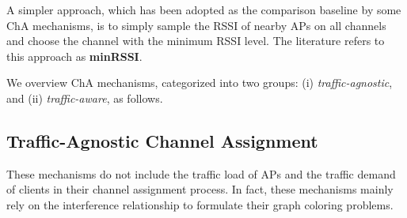 A simpler approach, which has been adopted as the comparison baseline by some ChA mechanisms, is to simply sample the RSSI of nearby APs on all channels and choose the channel with the minimum RSSI level.
The literature refers to this approach as \textbf{minRSSI}.



We overview ChA mechanisms, categorized into two groups: (i) \textit{traffic-agnostic}, and (ii) \textit{traffic-aware}, as follows.



\subsection{{Traffic-Agnostic Channel Assignment}} 
\label{ChA_traffic_ag}
These mechanisms do not include the traffic load of APs and the traffic demand of clients in their channel assignment process.
In fact, these mechanisms mainly rely on the interference relationship to formulate their graph coloring problems.


